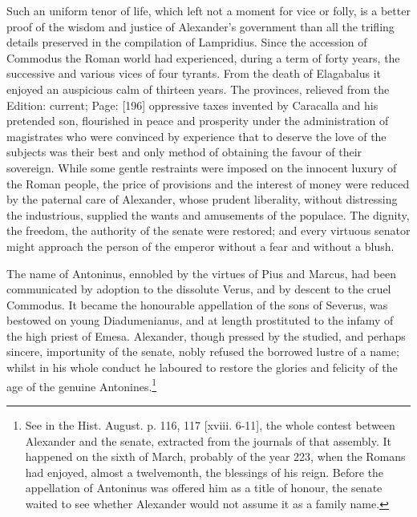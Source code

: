 Such an uniform tenor of life, which left not a moment for vice or folly, is a better proof of the wisdom and justice of Alexander\texthebrew{}’s government than all the trifling details preserved in the compilation of Lampridius. Since the accession of Commodus the Roman world had experienced, during a term of forty years, the successive and various vices of four tyrants. From the death of Elagabalus it enjoyed an auspicious calm of thirteen years. The provinces, relieved from the Edition: current; Page: [196] oppressive taxes invented by Caracalla and his pretended son, flourished in peace and prosperity under the administration of magistrates who were convinced by experience that to deserve the love of the subjects was their best and only method of obtaining the favour of their sovereign. While some gentle restraints were imposed on the innocent luxury of the Roman people, the price of provisions and the interest of money were reduced by the paternal care of Alexander, whose prudent liberality, without distressing the industrious, supplied the wants and amusements of the populace. The dignity, the freedom, the authority of the senate were restored; and every virtuous senator might approach the person of the emperor without a fear and without a blush.

The name of Antoninus, ennobled by the virtues of Pius and Marcus, had been communicated by adoption to the dissolute Verus, and by descent to the cruel Commodus. It became the honourable appellation of the sons of Severus, was bestowed on young Diadumenianus, and at length prostituted to the infamy of the high priest of Emesa. Alexander, though pressed by the studied, and perhaps sincere, importunity of the senate, nobly refused the borrowed lustre of a name; whilst in his whole conduct he laboured to restore the glories and felicity of the age of the genuine Antonines.\footnote{See in the Hist. August. p. 116, 117 [xviii. 6-11], the whole contest between Alexander and the senate, extracted from the journals of that assembly. It happened on the sixth of March, probably of the year 223, when the Romans had enjoyed, almost a twelvemonth, the blessings of his reign. Before the appellation of Antoninus was offered him as a title of honour, the senate waited to see whether Alexander would not assume it as a family name.}

